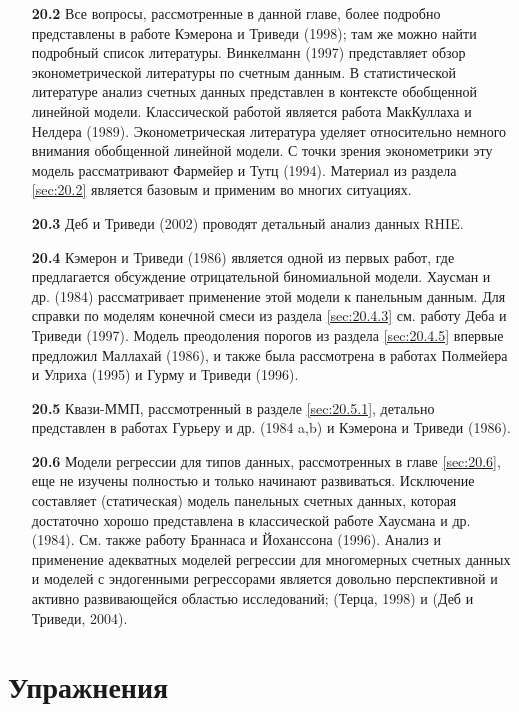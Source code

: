 \noindent
\begin{itemize}
    \item[\textbf{20.2}]
Все вопросы, рассмотренные в данной главе, более подробно представлены в работе Кэмерона и Триведи (1998); там же можно найти подробный список литературы. Винкелманн (1997) представляет обзор эконометрической литературы по счетным данным. В статистической литературе анализ счетных данных представлен в контексте обобщенной линейной модели. Классической работой является работа МакКуллаха и Нелдера (1989). Эконометрическая литература уделяет относительно немного внимания обобщенной линейной модели. С точки зрения эконометрики эту модель рассматривают Фармейер и Тутц (1994). Материал из раздела \ref{sec:20.2} является базовым и применим во многих ситуациях.

    \item[\textbf{20.3}]
Деб и Триведи (2002) проводят детальный анализ данных RHIE.

    \item[\textbf{20.4}]
Кэмерон и Триведи (1986) является одной из первых работ, где предлагается обсуждение отрицательной биномиальной модели. Хаусман и др. (1984) рассматривает применение этой модели к панельным данным. Для справки по моделям конечной смеси из раздела \ref{sec:20.4.3} см. работу Деба и Триведи (1997). Модель преодоления порогов из раздела \ref{sec:20.4.5} впервые предложил Маллахай (1986), и также была рассмотрена в работах Полмейера и Улриха (1995) и Гурму и Триведи (1996).

    \item[\textbf{20.5}]
Квази-ММП, рассмотренный в разделе \ref{sec:20.5.1}, детально представлен в работах Гурьеру и др. (1984 a,b) и Кэмерона и Триведи (1986).

    \item[\textbf{20.6}]
Модели регрессии для типов данных, рассмотренных в главе \ref{sec:20.6}, еще не изучены полностью и только начинают развиваться. Исключение составляет (статическая) модель панельных счетных данных, которая достаточно хорошо представлена в классической работе Хаусмана и др. (1984). См. также работу Браннаса и Йоханссона (1996). Анализ и применение адекватных моделей регрессии для многомерных счетных данных и моделей с эндогенными регрессорами является довольно перспективной и активно развивающейся областью исследований; (Терца, 1998) и (Деб и Триведи, 2004).
\end{itemize}




\section{Упражнения}\label{sec:20.ex}

